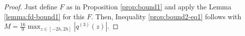 \begin{proof}
	Just define $F$ as in Proposition \ref{prop:bound1} and apply the Lemma \ref{lemma:fd-bound1} for this $F$.
	Then, Inequality \eqref{prop:bound2-eq1} follows with
	$M = \frac{16}{9}\max_{z \in [-2h,2h]}{|q^{(3)}(z)|}$.
	\renewcommand\qedsymbol{} %
\end{proof}
